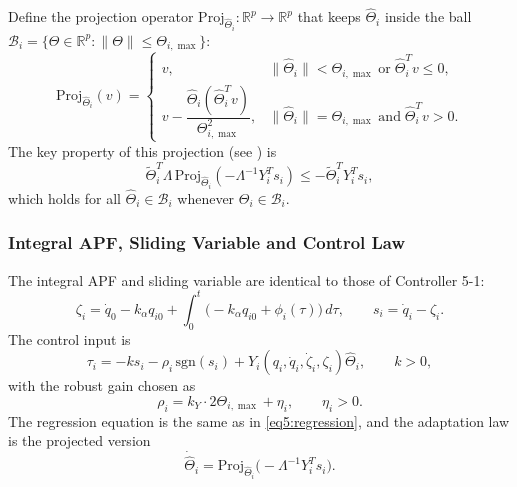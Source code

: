 Define the projection operator
$\mathrm{Proj}_{\hat{\Theta}_i} : \mathbb{R}^p \to \mathbb{R}^p$ that keeps $\hat{\Theta}_i$
inside the ball $\mathcal{B}_i = \{\Theta \in \mathbb{R}^p : \|\Theta\| \le \Theta_{i,\max}\}$:
\begin{equation}\label{eq5-3:proj}
	\mathrm{Proj}_{\hat{\Theta}_i}(v) =
	\begin{cases}
		v, & \|\hat{\Theta}_i\| < \Theta_{i,\max}
		\;\text{or}\; \hat{\Theta}_i^T v \le 0,\\[2pt]
		v - \dfrac{\hat{\Theta}_i(\hat{\Theta}_i^T v)}{\Theta_{i,\max}^2},
		& \|\hat{\Theta}_i\| = \Theta_{i,\max}
		\;\text{and}\; \hat{\Theta}_i^T v > 0.
	\end{cases}
\end{equation}
The key property of this projection (see \cite{ioannouSunRobustAdaptiveControl1996}) is
\begin{equation}\label{eq5-3:proj_prop}
	\tilde{\Theta}_i^T \Lambda\,\mathrm{Proj}_{\hat{\Theta}_i}(-\Lambda^{-1}Y_i^T s_i)
	\le -\tilde{\Theta}_i^T Y_i^T s_i,
\end{equation}
which holds for all $\hat{\Theta}_i \in \mathcal{B}_i$ whenever $\Theta_i \in \mathcal{B}_i$.

\subsubsection{Integral APF, Sliding Variable and Control Law}

The integral APF and sliding variable are identical to those of Controller 5-1:
\begin{equation}\label{eq5-3:zeta}
	\zeta_i = \dot{q}_0 - k_\alpha q_{i0}
	+ \int_0^t \bigl(-k_\alpha q_{i0} + \phi_i(\tau)\bigr)\,d\tau,\qquad
	s_i = \dot{q}_i - \zeta_i.
\end{equation}
The control input is
\begin{equation}\label{eq5-3:control_input}
	\tau_i = -k s_i - \rho_i\,\mathrm{sgn}(s_i)
	+ Y_i(q_i,\dot{q}_i,\dot{\zeta}_i,\zeta_i) \hat{\Theta}_i,\qquad k>0,
\end{equation}
with the robust gain chosen as
\begin{equation}\label{eq5-3:rho}
	\rho_i = k_Y \cdot 2\Theta_{i,\max} + \eta_i,\qquad \eta_i > 0.
\end{equation}
The regression equation is the same as in \eqref{eq5:regression}, and the adaptation law
is the projected version
\begin{equation}\label{eq5-3:adaptation}
	\dot{\hat{\Theta}}_i = \mathrm{Proj}_{\hat{\Theta}_i}\bigl(-\Lambda^{-1}Y_i^T s_i\bigr).
\end{equation}

